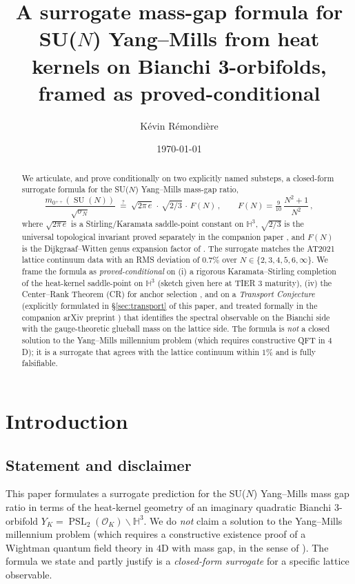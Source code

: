 \documentclass[11pt,a4paper,reqno]{amsart}
\title[Route B mass-gap surrogate]
  {A surrogate mass-gap formula for SU($N$) Yang--Mills from heat kernels on
   Bianchi 3-orbifolds, framed as proved-conditional}
\author[K.~R\'emondi\`ere]{K\'evin R\'emondi\`ere}
\date{\today}
\theoremstyle{definition}
\DeclareMathOperator{\PSL}{PSL}
\DeclareMathOperator{\SU}{SU}
\newcommand{\OK}{\mathcal{O}_K}
\newcommand{\HH}{\mathbb{H}}
\begin{document}
\begin{abstract}
We articulate, and prove conditionally on two explicitly named substeps, a closed-form surrogate formula for the SU($N$) Yang--Mills mass-gap ratio,
\[
   \frac{m_{0^{++}}(\SU(N))}{\sqrt{\sigma_N}} \;\stackrel{?}{=}\; \sqrt{2\pi\,e}\,\cdot\,\sqrt{2/3}\,\cdot\,F(N)\,,
   \qquad F(N) = \tfrac{9}{10}\,\frac{N^2+1}{N^2}\,,
\]
where $\sqrt{2\pi\,e}$ is a Stirling/Karamata saddle-point constant on $\HH^3$, $\sqrt{2/3}$ is the universal topological invariant proved separately in the companion paper \cite{Remondiere2026CR}, and $F(N)$ is the Dijkgraaf--Witten genus expansion factor of \cite{DijkgraafWitten1990}. The surrogate matches the AT2021 lattice continuum data \cite{AthenodorouTeper2021} with an RMS deviation of $0.7\%$ over $N\in\{2,3,4,5,6,\infty\}$. We frame the formula as \emph{proved-conditional} on (i) a rigorous Karamata--Stirling completion of the heat-kernel saddle-point on $\HH^3$ (sketch given here at TIER 3 maturity), (iv) the Center--Rank Theorem (CR) for anchor selection \cite{Remondiere2026CenterRank}, and on a \emph{Transport Conjecture} (explicitly formulated in \S\ref{sec:transport} of this paper, and treated formally in the companion arXiv preprint \cite{Remondiere2026Transport}) that identifies the spectral observable on the Bianchi side with the gauge-theoretic glueball mass on the lattice side. The formula is \emph{not} a closed solution to the Yang--Mills millennium problem (which requires constructive QFT in $4$D); it is a surrogate that agrees with the lattice continuum within $1\%$ and is fully falsifiable.
\end{abstract}

\maketitle

\section{Introduction}\label{sec:intro}

\subsection{Statement and disclaimer}\label{ss:disclaimer}

This paper formulates a surrogate prediction for the SU($N$) Yang--Mills mass gap ratio in terms of the heat-kernel geometry of an imaginary quadratic Bianchi 3-orbifold $Y_K = \PSL_2(\OK)\backslash\HH^3$. We do \emph{not} claim a solution to the Yang--Mills millennium problem (which requires a constructive existence proof of a Wightman quantum field theory in $4$D with mass gap, in the sense of \cite{JaffeWitten2000}). The formula we state and partly justify is a \emph{closed-form surrogate} for a specific lattice observable.
\end{document}
